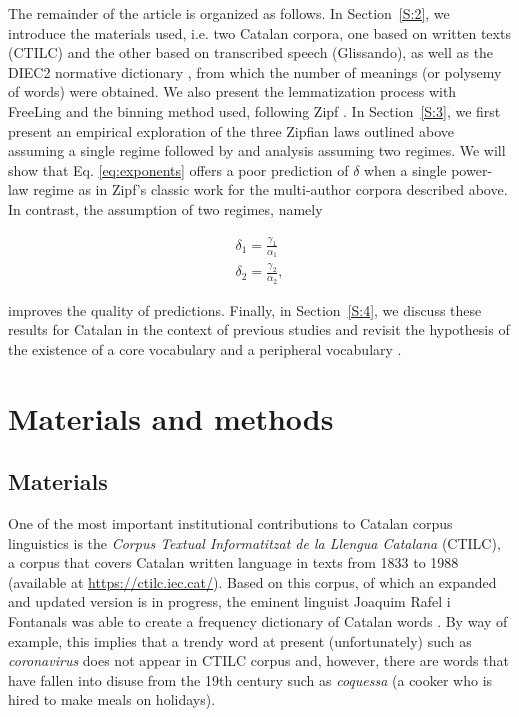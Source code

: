 \documentclass[10pt,letterpaper]{article}
\begin{document}
The remainder of the article is organized as follows. In Section~\ref{S:2}, we introduce the materials used, i.e. two Catalan corpora, one based on written texts (CTILC) and the other based on transcribed speech (Glissando), as well as the DIEC2 normative dictionary \cite{DIEC2}, from which the number of meanings (or polysemy of words) were obtained. We also present the lemmatization process with FreeLing \cite{Padro2012} and the binning method used, following Zipf \cite{Zipf_MFL}. In Section~\ref{S:3}, we first present an empirical exploration of the three Zipfian laws outlined above 
assuming a single regime followed by and analysis assuming two regimes.
We will show that Eq. \ref{eq:exponents} offers a poor prediction of $\delta$ when a single power-law regime as in Zipf's classic work for the multi-author corpora described above. In contrast, the assumption of two regimes, namely

\begin{eqnarray}
\delta_1=\frac{\gamma_1}{\alpha_1} \label{eq:exponents2} \\
\delta_2=\frac{\gamma_2}{\alpha_2}, \label{eq:exponents1}
\end{eqnarray}

improves the quality of predictions. 
Finally, in Section~\ref{S:4}, we discuss these results for Catalan in the context of previous studies \cite{bond2019testing, Casas2019, pilsen, Ilgen2007} 
and revisit the hypothesis of the existence of a core vocabulary and a peripheral vocabulary \cite{ferrer2001two,Williams2015,petersen2012languages}. 

\section*{Materials and methods}
\label{S:2}

\subsection*{Materials}

One of the most important institutional contributions to Catalan corpus linguistics is the \textit{Corpus Textual Informatitzat de la Llengua Catalana} (CTILC), a corpus that covers Catalan written language in texts from 1833 to 1988 (available at \url{https://ctilc.iec.cat/}). Based on this corpus, of which an expanded and updated version is in progress, the eminent linguist Joaquim Rafel i Fontanals was able to create a frequency dictionary of Catalan words \cite{diccionari_1998}. By way of example, this implies that a trendy word at present (unfortunately) such as \textit{coronavirus} does not appear in CTILC corpus and, however, there are words that have fallen into disuse from the 19th century such as \textit{coquessa} (a cooker who is hired to make meals on holidays).
\end{document}

